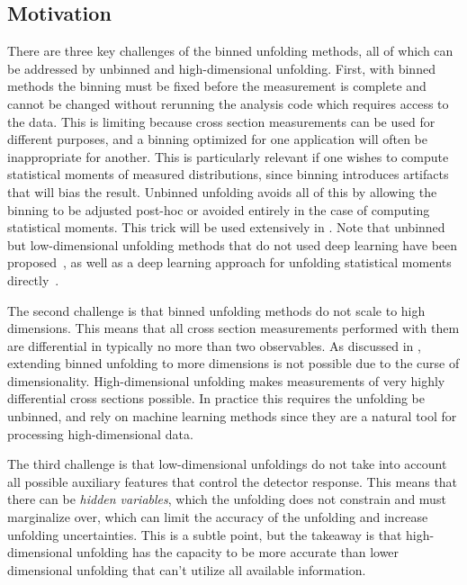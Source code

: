 \subsection{Motivation}
\label{sec:unbinned-motivation}

There are three key challenges of the binned unfolding methods, all of which can be addressed by unbinned and high-dimensional unfolding.
First, with binned methods the binning must be fixed before the measurement is complete and cannot be changed without rerunning the analysis code which requires access to the data.
This is limiting because cross section measurements can be used for different purposes, and a binning optimized for one application will often be inappropriate for another.
This is particularly relevant if one wishes to compute statistical moments of measured distributions, since binning introduces artifacts that will bias the result.
Unbinned unfolding avoids all of this by allowing the binning to be adjusted post-hoc or avoided entirely in the case of computing statistical moments.
This trick will be used extensively in .
Note that unbinned but low-dimensional unfolding methods that do not used deep learning have been proposed~\cite{Lindemann:1995ut, Aslan:2003vu, Glazov:2017vni}, as well as a deep learning approach for unfolding statistical moments directly~\cite{Desai:2024yft}.

The second challenge is that binned unfolding methods do not scale to high dimensions.
This means that all cross section measurements performed with them are differential in typically no more than two observables.
As discussed in , extending binned unfolding to more dimensions is not possible due to the curse of dimensionality.
High-dimensional unfolding makes measurements of very highly differential cross sections possible.
In practice this requires the unfolding be unbinned, and rely on machine learning methods since they are a natural tool for processing high-dimensional data.

The third challenge is that low-dimensional unfoldings do not take into account all possible auxiliary features that control the detector response.
This means that there can be \textit{hidden variables}, which the unfolding does not constrain and must marginalize over, which can limit the accuracy of the unfolding and increase unfolding uncertainties.
This is a subtle point, but the takeaway is that high-dimensional unfolding has the capacity to be more accurate than lower dimensional unfolding that can't utilize all available information.

